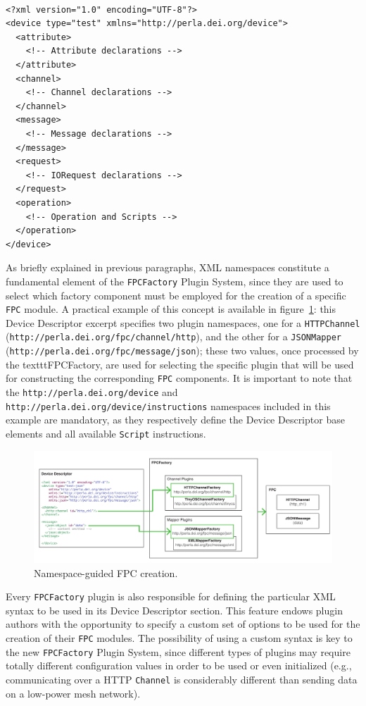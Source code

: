 ~\\
\lstset{language=XML}
\begin{lstlisting}[caption={The skeleton of the new XML Device Descriptor.}]
<?xml version="1.0" encoding="UTF-8"?>
<device type="test" xmlns="http://perla.dei.org/device">
  <attribute>
    <!-- Attribute declarations -->
  </attribute>
  <channel>
    <!-- Channel declarations -->
  </channel>
  <message>
    <!-- Message declarations -->
  </message>
  <request>
    <!-- IORequest declarations -->
  </request>
  <operation>
    <!-- Operation and Scripts -->
  </operation>
</device>
\end{lstlisting}

As briefly explained in previous paragraphs, XML namespaces constitute a
fundamental element of the \texttt{FPCFactory} Plugin System, since they are
used to select which factory component must be employed for the creation of a
specific \texttt{FPC} module. A practical example of this concept is available
in figure~\ref{fig:dd_namespace}: this Device Descriptor excerpt specifies two
plugin namespaces, one for a \texttt{HTTPChannel}
(\texttt{http://perla.dei.org/fpc/channel/http}), and the other for a
\texttt{JSONMapper} (\texttt{http://perla.dei.org/fpc/message/json}); these two
values, once processed by the texttt{FPCFactory}, are used for selecting the
specific plugin that will be used for constructing the corresponding
\texttt{FPC} components. It is important to note that the
\texttt{http://perla.dei.org/device} and
\texttt{http://perla.dei.org/device/instructions} namespaces included in this
example are mandatory, as they respectively define the Device Descriptor base
elements and all available \texttt{Script} instructions.

\begin{figure}[h!]
\center
\includegraphics[width=\textwidth]{imgs/dd_namespace.pdf}
\caption{Namespace-guided FPC creation.}
\label{fig:dd_namespace}
\end{figure}

Every \texttt{FPCFactory} plugin is also responsible for defining the
particular XML syntax to be used in its Device Descriptor section. This feature
endows plugin authors with the opportunity to specify a custom set of options
to be used for the creation of their \texttt{FPC} modules. The possibility of
using a custom syntax is key to the new \texttt{FPCFactory} Plugin System,
since different types of plugins may require totally different configuration
values in order to be used or even initialized (e.g., communicating over a HTTP
\texttt{Channel} is considerably different than sending data on a low-power
mesh network).


